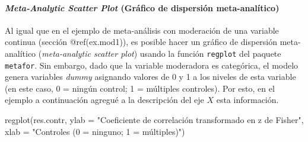 \documentclass[
  bookmarksnumbered]{article}
\newenvironment{Shaded}{\begin{snugshade}}{\end{snugshade}}
\newcommand{\AttributeTok}[1]{\textcolor[rgb]{0.00,0.34,0.68}{#1}}
\newcommand{\FunctionTok}[1]{\textcolor[rgb]{0.39,0.29,0.61}{#1}}
\newcommand{\NormalTok}[1]{\textcolor[rgb]{0.12,0.11,0.11}{#1}}
\newcommand{\StringTok}[1]{\textcolor[rgb]{0.75,0.01,0.01}{#1}}
\begin{document}
\hypertarget{meta-scatter2}{%
\paragraph{\texorpdfstring{\emph{Meta-Analytic Scatter Plot} (Gráfico de dispersión meta-analítico)}{Meta-Analytic Scatter Plot (Gráfico de dispersión meta-analítico)}}\label{meta-scatter2}}

Al igual que en el ejemplo de meta-análisis con moderación de una variable continua (sección @ref(ex.mod1)), es posible hacer un gráfico de dispersión meta-analítico (\emph{meta-analytic scatter plot}) usando la función \texttt{regplot} del paquete \texttt{metafor}. Sin embargo, dado que la variable moderadora es categórica, el modelo genera variables \emph{dummy} asignando valores de 0 y 1 a los niveles de esta variable (en este caso, 0 = ningún control; 1 = múltiples controles). Por esto, en el ejemplo a continuación agregué a la descripción del eje \(X\) esta información.

\begin{Shaded}
\begin{Highlighting}[]
\FunctionTok{regplot}\NormalTok{(res.contr,}
        \AttributeTok{ylab =} \StringTok{"Coeficiente de correlación transformado en z de Fisher"}\NormalTok{,}
        \AttributeTok{xlab =} \StringTok{"Controles (0 = ninguno; 1 = múltiples)"}\NormalTok{)}
\end{Highlighting}
\end{Shaded}
\end{document}
